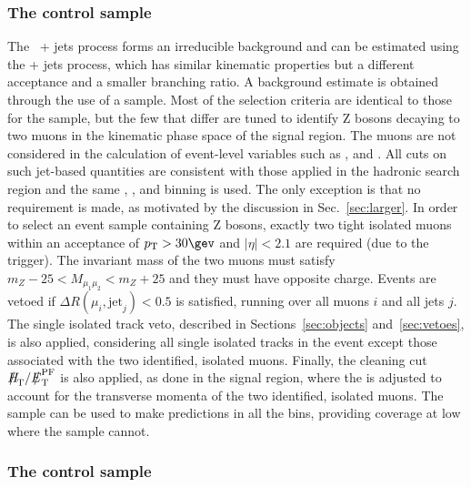 \subsubsection{The \texorpdfstring{\mmj}{di-muon plus jets} control sample}

The \znunu\ + jets process forms an irreducible background and can be
estimated using the \zmumu + jets process, which has similar kinematic
properties but a different acceptance and a smaller branching ratio. A
background estimate is obtained through the use of a \mmj sample. Most
of the selection criteria are identical to those for the \mj sample,
but the few that differ are tuned to identify Z bosons decaying to two
muons in the kinematic phase space of the signal region. The muons are
not considered in the calculation of event-level variables such as
\scalht, \mht and \alphat. All cuts on such jet-based quantities are
consistent with those applied in the hadronic search region and the
same \njet, \nb, and \scalht binning is used. The only exception is
that no \alphat requirement is made, as motivated by the discussion in
Sec.~\ref{sec:larger}. In order to select an event sample containing Z
bosons, exactly two tight isolated muons within an acceptance of $\Pt
> 30\gev$ and $|\eta| < 2.1$ are required (due to the trigger). The
invariant mass of the two muons must satisfy $m_{Z} - 25 <
M_{\mu_1\mu_2} < m_{Z} + 25$ and they must have opposite charge. Events are vetoed if $\Delta
R(\mu_{i},\textrm{jet}_j) < 0.5$ is satisfied, running over all muons
$i$ and all jets $j$. The single isolated track veto, described in
Sections~\ref{sec:objects} and~\ref{sec:vetoes}, is also
applied, considering all single isolated tracks in the event except
those associated with the two identified, isolated muons. Finally, the
cleaning cut $\mht/\pfmet$ is also applied, as done in the signal
region, where the \pfmet is adjusted to account for the transverse
momenta of the two identified, isolated muons. The \mmj sample can be
used to make predictions in all the \scalht bins, providing coverage
at low \scalht where the \gj sample cannot.

\subsubsection{The \texorpdfstring{\gj}{photon plus jets} control sample}
\label{subsec:photoncontrolSelection}

